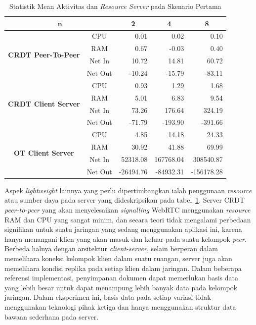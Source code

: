 \begin{table}[H]
 \centering
\begin{tabular}{|cc|r|r|r|}
\hline
\multicolumn{2}{|c|}{$\boldsymbol{n}$} & \multicolumn{1}{c|}{\textbf{2}} & \multicolumn{1}{c|}{\textbf{4}} & \multicolumn{1}{c|}{\textbf{8}} \\ \hline
\multicolumn{1}{|c|}{\multirow{4}{*}{\textbf{CRDT Peer-To-Peer}}} & CPU & 0.01 & 0.02 & 0.10 \\ \cline{2-5}
\multicolumn{1}{|c|}{} & RAM & 0.67 & -0.03 & 0.40 \\ \cline{2-5}
\multicolumn{1}{|c|}{} & Net In & 10.72 & 14.81 & 60.72 \\ \cline{2-5}
\multicolumn{1}{|c|}{} & Net Out & -10.24 & -15.79 & -83.11 \\ \hline
\multicolumn{1}{|c|}{\multirow{4}{*}{\textbf{CRDT Client Server}}} & CPU & 0.93 & 1.29 & 1.68 \\ \cline{2-5}
\multicolumn{1}{|c|}{} & RAM & 5.01 & 6.83 & 9.54 \\ \cline{2-5}
\multicolumn{1}{|c|}{} & Net In & 73.26 & 176.64 & 324.19 \\ \cline{2-5}
\multicolumn{1}{|c|}{} & Net Out & -71.79 & -193.90 & -391.66 \\ \hline
\multicolumn{1}{|c|}{\multirow{4}{*}{\textbf{OT Client Server}}} & CPU & 4.85 & 14.18 & 24.33 \\ \cline{2-5}
\multicolumn{1}{|c|}{} & RAM & 30.92 & 41.88 & 69.99 \\ \cline{2-5}
\multicolumn{1}{|c|}{} & Net In & 52318.08 & 167768.04 & 308540.87 \\ \cline{2-5}
\multicolumn{1}{|c|}{} & Net Out & -26494.76 & -84932.31 & -156178.28 \\ \hline
\end{tabular}
 \caption{Statistik Mean Aktivitas dan \textit{Resource Server} pada Skenario Pertama}
 \label{tab:resource-server-1}
\end{table}

Aspek \textit{lightweight} lainnya yang perlu dipertimbangkan ialah penggunaan \textit{resource} atau sumber daya pada server yang dideskripsikan pada tabel~\ref{tab:resource-server-1}. Server CRDT \textit{peer-to-peer} yang akan menyelesaikan \textit{signalling} WebRTC menggunakan \textit{resource} RAM dan CPU yang sangat minim, dan secara teori tidak mengalami perbedaan signifikan untuk suatu jaringan yang sedang menggunakan aplikasi ini, karena hanya menangani klien yang akan masuk dan keluar pada suatu kelompok \textit{peer}. Berbeda halnya dengan arsitektur \textit{client-server}, selain berperan dalam memelihara koneksi kelompok klien dalam suatu ruangan, server juga akan memelihara kondisi replika pada setiap klien dalam jaringan. Dalam beberapa referensi implementasi, penyimpanan dokumen dapat memerlukan basis data yang lebih besar untuk dapat menampung lebih banyak data pada kelompok jaringan. Dalam eksperimen ini, basis data pada setiap variasi tidak menggunakan teknologi pihak ketiga dan hanya menggunakan struktur data bawaan sederhana pada server.


